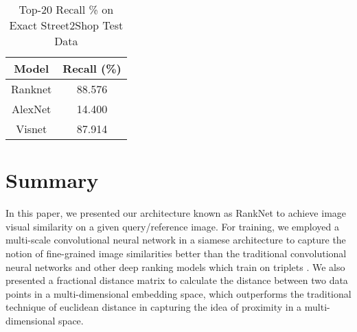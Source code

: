 \documentclass[10pt,twocolumn,letterpaper]{article}
\begin{document}
\begin{table}[h]
\caption{ Top-20 Recall {\%} on Exact Street2Shop Test Data}
\label{table_example}
\begin{center}
\begin{tabular}{|c||c|}
\hline
Model & Recall (\%)\\
\hline
\hline
Ranknet & 88.576\\
\hline
AlexNet & 14.400\\
\hline
Visnet & 87.914\\
\hline
\end{tabular}
\end{center}
\end{table}


\section{Summary}
In this paper, we presented our architecture known as RankNet to achieve image visual similarity on a given query/reference image. For training, we employed a multi-scale convolutional neural network in a siamese architecture to capture the notion of fine-grained image similarities better than the traditional convolutional neural networks and other deep ranking models which train on triplets \cite{c36} . We also presented a fractional distance matrix to calculate the distance between two data points in a multi-dimensional embedding space, which outperforms the traditional technique of euclidean distance in capturing the idea of proximity in a multi-dimensional space.
\end{document}
